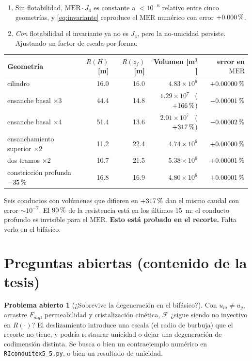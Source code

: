 \documentclass[11pt,a4paper]{article}
\theoremstyle{plain}
\theoremstyle{definition}
\newtheorem{problema}{Problema abierto}
\theoremstyle{remark}
\newcommand{\pc}{\ifmmode\text{\,\%}\else\,\%\fi}
\newcommand{\MER}{\mathrm{MER}}
\begin{document}
\begin{enumerate}
\item Sin flotabilidad, $\MER\cdot J_4$ es constante a $<10^{-6}$ relativo
  entre cinco geometrías, y \eqref{eq:invariante} reproduce el $\MER$
  numérico con error $+0.000\pc$.
\item \emph{Con} flotabilidad el invariante ya no es $J_4$, pero la
  no-unicidad persiste. Ajustando un factor de escala por forma:
\end{enumerate}

\begin{center}
\small
\begin{tabular}{@{}lrrrr@{}}
\toprule
\textbf{Geometría} & $R(H)$ [m] & $R(z_f)$ [m] & \textbf{Volumen} [m$^3$] & \textbf{error en} $\MER$ \\
\midrule
cilindro & 16.0 & 16.0 & $4.83\times10^6$ & $+0.00000\pc$ \\
ensanche basal $\times3$ & 44.4 & 14.8 & $1.29\times10^7$ \ ($+166\pc$) & $-0.00001\pc$ \\
ensanche basal $\times4$ & 51.4 & 13.6 & $2.01\times10^7$ \ ($+317\pc$) & $-0.00002\pc$ \\
ensanchamiento superior $\times2$ & 11.2 & 22.4 & $4.74\times10^6$ & $+0.00000\pc$ \\
dos tramos $\times2$ & 10.7 & 21.5 & $5.38\times10^6$ & $+0.00001\pc$ \\
constricción profunda $-35\pc$ & 16.8 & 16.9 & $4.80\times10^6$ & $+0.00001\pc$ \\
\bottomrule
\end{tabular}
\end{center}

Seis conductos con volúmenes que difieren en $+317\pc$ dan el mismo caudal
con error $\sim10^{-7}$. El $90\pc$ de la resistencia está en los últimos
$15$~m: el conducto profundo es invisible para el $\MER$. \textbf{Esto está
probado en el recorte.} Falta verlo en el bifásico.

\section{Preguntas abiertas (contenido de la tesis)}

\begin{problema}[¿Sobrevive la degeneración en el bifásico?]
Con $u_m\neq u_g$, arrastre $F_{mg}$, permeabilidad y cristalización
cinética, $\mathcal{F}$ ¿sigue siendo no inyectivo en $R(\cdot)$? El
deslizamiento introduce una escala (el radio de burbuja) que el recorte no
tiene, y podría restaurar unicidad o dejar una degeneración de codimensión
distinta. Se busca o bien un contraejemplo numérico en
\texttt{RIconduitex5\_5.py}, o bien un resultado de unicidad.
\end{problema}
\end{document}
